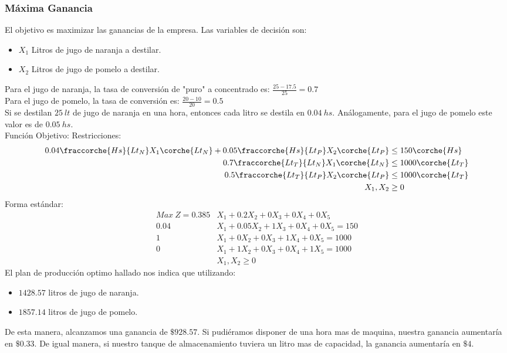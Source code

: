 \begin{homeworkProblem}[-1][Citrus]
\subsubsection{Máxima Ganancia}
El objetivo es maximizar las ganancias de la empresa.
Las variables de decisión son:
\begin{itemize}
  \item $X_1$ Litros de jugo de naranja a destilar.
  \item $X_2$ Litros de jugo de pomelo a destilar.
\end{itemize}
Para el jugo de naranja, la tasa de conversión de "puro" a concentrado es: $\frac{25-17.5}{25} = 0.7$ \\
Para el jugo de pomelo, la tasa de conversión es: $ \frac{20-10}{20} = 0.5$ \\
Si se destilan $25\ lt$ de jugo de naranja en una hora, entonces cada litro se destila en $0.04\ hs$. Análogamente, para el jugo de pomelo este valor es de $0.05\ hs$. \\
Función Objetivo: 
Restricciones:
\begin{align*}
  0.04\fraccorche{Hs}{Lt_N}X_1\corche{Lt_N} + 0.05\fraccorche{Hs}{Lt_P}X_2\corche{Lt_P} &\le 150\corche{Hs} \\
  0.7\fraccorche{Lt_T}{Lt_N}X_1\corche{Lt_N}                                            &\le 1000\corche{Lt_T} \\
  0.5\fraccorche{Lt_T}{Lt_P}X_2\corche{Lt_P}                                            &\le 1000\corche{Lt_T} \\
  X_1,X_2 &\ge 0 
\end{align*}
Forma estándar:
\begin{align*}
    Max\ Z = 0.385&X_1 + 0.2X_2 + 0X_3 + 0X_4 + 0X_5 \\
    0.04&X_1 + 0.05X_2 + 1X_3 + 0X_4 + 0X_5 = 150 \\
    1&X_1 + 0X_2 + 0X_3 + 1X_4 + 0X_5 = 1000 \\
    0&X_1 + 1X_2 + 0X_3 + 0X_4 + 1X_5 = 1000 \\
    &X_1,X_2 \ge 0
\end{align*}
El plan de producción optimo hallado nos indica que utilizando: 
\begin{itemize}
  \item $1428.57$ litros de jugo de naranja.
  \item $1857.14$ litros de jugo de pomelo.
\end{itemize}
De esta manera, alcanzamos una ganancia de $\$928.57$. Si pudiéramos disponer de una hora mas de maquina, nuestra ganancia aumentaría en $\$0.33$. De igual manera, si nuestro tanque de almacenamiento tuviera un litro mas de capacidad, la ganancia aumentaría en $\$4$.


\end{homeworkProblem}
